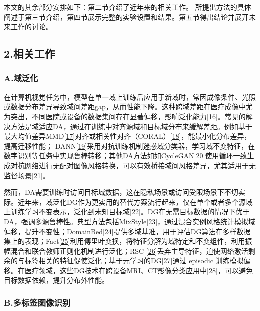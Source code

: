本文的其余部分安排如下：第二节介绍了近年来的相关工作。 所提出方法的具体阐述于第三节介绍，第四节展示完整的实验设置和结果。第五节得出结论并展开未来工作的讨论。

\subsection{2.相关工作}\label{ux76f8ux5173ux5de5ux4f5c}

\subsubsection{A.域泛化}\label{a.ux57dfux6cdbux5316}

在计算机视觉任务中，模型在单一域上训练后应用于新域时，常因成像条件、光照或数据分布差异导致域间差距gap，从而性能下降。这种跨域差距在医疗成像中尤为突出，不同医院或设备的数据集间存在显著偏移，影响泛化能力\hyperref[_Ref213949439]{{[}16{]}}。常见的解决方法是域适应DA，通过在训练中对齐源域和目标域分布来缓解差距。例如基于最大均值差异MMD\hyperref[_Ref213949448]{{[}17{]}}对齐或相关性对齐（CORAL）\hyperref[_Ref213949453]{{[}18{]}}，能最小化分布差异，提高迁移性能； DANN\hyperref[_Ref213949479]{{[}19{]}}采用对抗训练机制迷惑域分类器，学习域不变特征，在数字识别等任务中实现鲁棒转移；其他DA方法如如CycleGAN\hyperref[_Ref213949490]{{[}20{]}}使用循环一致生成对抗网络进行无配对图像风格转换，可以有效桥接域间风格差异，尤其适用于无监督场景\hyperref[_Ref213949530]{{[}21{]}}。

然而，DA需要训练时访问目标域数据，这在隐私场景或访问受限场景下不切实际。近年来，域泛化DG作为更实用的替代方案流行起来，仅在单个或者多个源域上训练学习不变表示，泛化到未知目标域\hyperref[_Ref213949554]{{[}22{]}}。DG在无需目标数据的情况下优于DA，强调多源鲁棒性。典型方法包括MixStyle\hyperref[_Ref213949562]{{[}23{]}}，通过混合实例风格统计模拟域偏移，提升不变性；DomainBed\hyperref[_Ref213949607]{{[}24{]}}提供多域基准，用于评估DG算法在多样数据集上的表现；Fact\hyperref[_Ref213949788]{{[}25{]}}利用傅里叶变换，将特征分解为域特定和不变组件，利用振幅混合和联合教师正则化机制进行泛化；RSC \hyperref[_Ref213949796]{{[}26{]}}丢弃主导特征，迫使网络激活剩余的与标签相关的特征促使泛化；基于元学习的DG\hyperref[_Ref213949803]{{[}27{]}}通过 episodic 训练模拟偏移。在医疗领域，这些DG技术在跨设备MRI、CT影像分类应用中\hyperref[_Ref213949863]{{[}28{]}}，可以避免目标数据依赖，提升分布外性能。

\subsubsection{B.多标签图像识别}\label{b.ux591aux6807ux7b7eux56feux50cfux8bc6ux522b}

